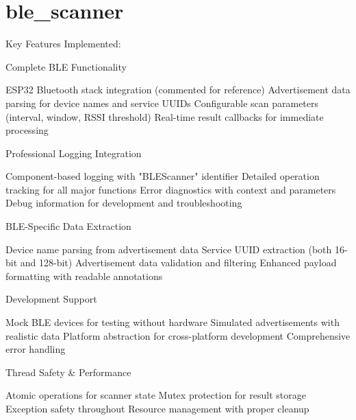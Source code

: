\chapter{ble\+\_\+scanner }
\hypertarget{md_ble__scanner}{}\label{md_ble__scanner}
Key Features Implemented\+:
\begin{DoxyEnumerate}
\item Complete BLE Functionality
\end{DoxyEnumerate}

ESP32 Bluetooth stack integration (commented for reference) Advertisement data parsing for device names and service UUIDs Configurable scan parameters (interval, window, RSSI threshold) Real-\/time result callbacks for immediate processing


\begin{DoxyEnumerate}
\item Professional Logging Integration
\end{DoxyEnumerate}

Component-\/based logging with "{}\+BLEScanner"{} identifier Detailed operation tracking for all major functions Error diagnostics with context and parameters Debug information for development and troubleshooting


\begin{DoxyEnumerate}
\item BLE-\/\+Specific Data Extraction
\end{DoxyEnumerate}

Device name parsing from advertisement data Service UUID extraction (both 16-\/bit and 128-\/bit) Advertisement data validation and filtering Enhanced payload formatting with readable annotations


\begin{DoxyEnumerate}
\item Development Support
\end{DoxyEnumerate}

Mock BLE devices for testing without hardware Simulated advertisements with realistic data Platform abstraction for cross-\/platform development Comprehensive error handling


\begin{DoxyEnumerate}
\item Thread Safety \& Performance
\end{DoxyEnumerate}

Atomic operations for scanner state Mutex protection for result storage Exception safety throughout Resource management with proper cleanup

